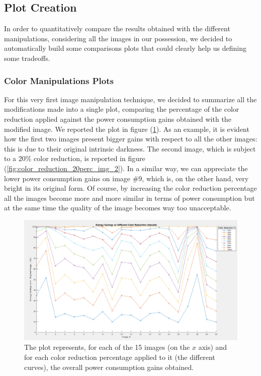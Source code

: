 \documentclass[a4paper]{article}
\begin{document}
    \subsection{Plot Creation}
        In order to quantitatively compare the results obtained with the different manipulations, considering all the images in our possession, we decided to automatically build some comparisons plots that could clearly help us defining some tradeoffs.
        \subsubsection{Color Manipulations Plots}
            For this very first image manipulation technique, we decided to summarize all the modifications made into a single plot, comparing the percentage of the color reduction applied against the power consumption gains obtained with the modified image.
            We reported the plot in figure (\ref{fig:ColorReductionOverall}). As an example, it is evident how the first two images present bigger gains with respect to all the other images: this is due to their original intrinsic darkness. The second image, which is subject to a $20\%$ color reduction, is reported in figure (\ref{fig:color_reduction_20perc_img_2}). In a similar way, we can appreciate the lower power consumption gains on image \#9, which is, on the other hand, very bright in its original form. Of course, by increasing the color reduction percentage all the images become more and more similar in terms of power consumption but at the same time the quality of the image becomes way too unacceptable.

            \begin{figure}[htp]
                \centering
                \includegraphics[width=1 \columnwidth]{./screenshots/ColorReductionOverall}
                \caption{
                        \label{fig:ColorReductionOverall}
                        The plot represents, for each of the 15 images (on the $x$ axis) and for each color reduction percentage applied to it (the different curves), the overall power consumption gains obtained.
                }
            \end{figure}
\end{document}
